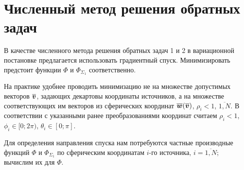 \section{Численный метод решения обратных задач}

В качестве численного метода решения обратных задач 1 и 2 в вариационной постановке предлагается использовать градиентный спуск. Минимизировать предстоит функции $\Phi$ и $\Phi_{\Sigma_1}$ соответственно.

На практике удобнее проводить минимизацию не на множестве допустимых векторов $\boldsymbol{\overline{v}}$, задающих декартовы координаты источников, а на множестве соответствующих им векторов из сферических координат $\boldsymbol{\overline{w}}(\boldsymbol{\overline{v}})$, $\rho_i < 1$, $\overline{1,N}$. В соответствии с указанными ранее преобразованиями координат считаем $\rho_i < 1$, $\phi_i \in [0; 2\pi)$, $\theta_i \in [0; \pi]$.

Для определения направления спуска нам потребуются частные производные функций $\Phi$ и $\Phi_{\Sigma_1}$ по сферическим координатам $i$-го источника, $i = \overline{1,N}$; вычислим их для $\Phi$.

